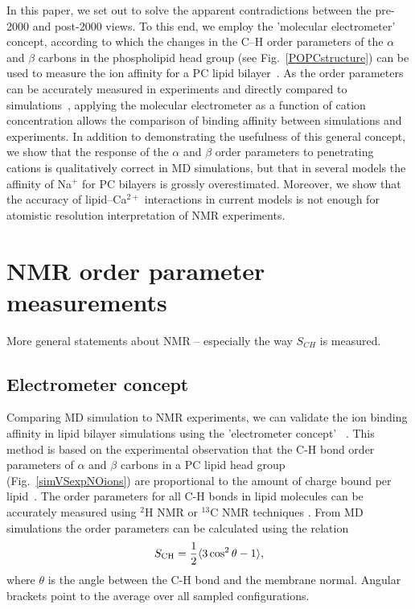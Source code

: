 In this paper, we set out to solve the apparent contradictions
between the pre-2000 and post-2000 views.
To this end, we employ the 'molecular electrometer' concept,
according to which the changes in the C--H order parameters of the $\alpha$ and $\beta$ carbons 
in the phospholipid head group (see Fig.~\ref{POPCstructure}) can be used to measure the ion affinity for a
PC lipid bilayer~\cite{brown77,akutsu81,altenbach84,seelig87,scherer89}.
As the order parameters can be accurately measured in experiments and directly compared to 
simulations~\cite{ollila16}, applying the molecular electrometer as a function of cation concentration allows the 
comparison of binding affinity between simulations and experiments.
In addition to demonstrating the usefulness of this general concept,
we show that the response of the $\alpha$ and $\beta$ order parameters to penetrating cations
is qualitatively correct in MD simulations, but that in several  models the affinity of Na$^{+}$ for PC bilayers
is grossly overestimated.
Moreover, we show that the accuracy of lipid--Ca$^{2+}$ interactions 
in current models is not enough for atomistic resolution interpretation of NMR experiments. 


\section{NMR order parameter measurements}
 
  More general statements about NMR  -- especially the way $S_{CH}$ is measured. 


\subsection{Electrometer concept} \label{section:electrometer} 

Comparing MD simulation to NMR experiments, we can validate the ion 
binding affinity in lipid bilayer simulations using the 'electrometer concept'~ \citep{seelig87, catte16}. 
This method is based on the experimental observation that the C-H bond order parameters of $\alpha$ and $\beta$ carbons in a PC lipid head group (Fig.~\ref{simVSexpNOions}) are proportional to the amount of charge bound per lipid~\citep{seelig87}. 
The order parameters for all C-H bonds in lipid molecules can be accurately measured using $^2$H NMR or $^{13}$C NMR techniques \citep{ollila16}. 
From MD simulations the order parameters can be calculated using the relation 
\begin{equation}\label{OP} 
S_{\rm CH}=\frac{1}{2}\langle 3\cos^2\theta -1 \rangle, 
\end{equation} 
where $\theta$ is the angle between the C-H bond and the membrane normal. 
Angular brackets point to the average over all sampled configurations. 
 
